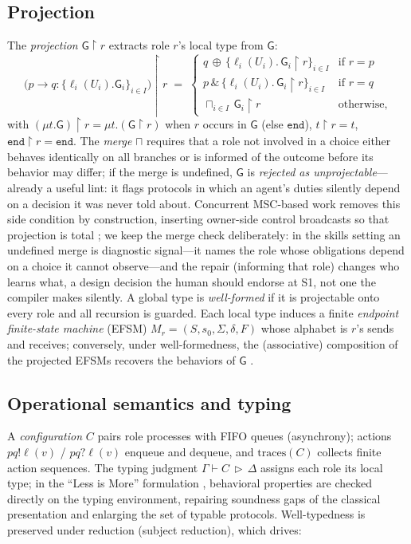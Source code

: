 \documentclass{article}
\newcommand{\gtG}{\mathsf{G}}
\newcommand{\ed}{\mathtt{end}}
\newcommand{\proj}[2]{#1\!\upharpoonright\!#2}
\newcommand{\sends}{\rightarrow}
\newcommand{\merge}{\sqcap}
\newcommand{\lbl}{\ell}
\begin{document}
\subsection{Projection}
The \emph{projection} $\proj{\gtG}{r}$ extracts role $r$'s local type from $\gtG$:
\[
\proj{\big(p \sends q : \{\lbl_i(U_i).\gtG_i\}_{i\in I}\big)}{r} \;=\;
\begin{cases}
q\,{\oplus}\,\{\lbl_i(U_i).\,\proj{\gtG_i}{r}\}_{i\in I} & \text{if } r=p\\[2pt]
p\,\&\,\{\lbl_i(U_i).\,\proj{\gtG_i}{r}\}_{i\in I} & \text{if } r=q\\[2pt]
\sqcap_{i\in I}\, \proj{\gtG_i}{r} & \text{otherwise,}
\end{cases}
\]
with $\proj{(\mu t.\gtG)}{r}=\mu t.(\proj{\gtG}{r})$ when $r$ occurs in $\gtG$ (else $\ed$), $\proj{t}{r}=t$, $\proj{\ed}{r}=\ed$. The \emph{merge} $\merge$ requires that a role not involved in a choice either behaves identically on all branches or is informed of the outcome before its behavior may differ; if the merge is undefined, $\gtG$ is \emph{rejected as unprojectable}---already a useful lint: it flags protocols in which an agent's duties silently depend on a decision it was never told about. Concurrent MSC-based work removes this side condition by construction, inserting owner-side control broadcasts so that projection is total \citep{bollig26}; we keep the merge check deliberately: in the skills setting an undefined merge is diagnostic signal---it names the role whose obligations depend on a choice it cannot observe---and the repair (informing that role) changes who learns what, a design decision the human should endorse at S1, not one the compiler makes silently. A global type is \emph{well-formed} if it is projectable onto every role and all recursion is guarded. Each local type induces a finite \emph{endpoint finite-state machine} (EFSM) $M_r=(S,s_0,\Sigma,\delta,F)$ whose alphabet is $r$'s sends and receives; conversely, under well-formedness, the (associative) composition of the projected EFSMs recovers the behaviors of $\gtG$ \citep{denielou12}.

\subsection{Operational semantics and typing}
A \emph{configuration} $C$ pairs role processes with FIFO queues (asynchrony); actions $pq!\lbl(v)$ / $pq?\lbl(v)$ enqueue and dequeue, and $\mathrm{traces}(C)$ collects finite action sequences. The typing judgment $\Gamma \vdash C \,\triangleright\, \Delta$ assigns each role its local type; in the ``Less is More'' formulation \citep{scalas19}, behavioral properties are checked directly on the typing environment, repairing soundness gaps of the classical presentation and enlarging the set of typable protocols. Well-typedness is preserved under reduction (subject reduction), which drives:
\end{document}
